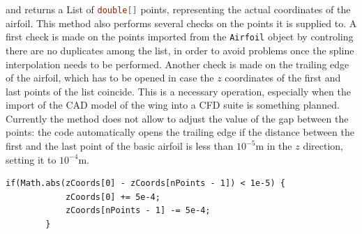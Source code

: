 and returns a \gls{List} of \lstinline[language=Java]!double[]! points, representing the actual coordinates of the airfoil. This method also performs several checks on the points it is supplied to. A first check is made on the points imported from the \lstinline[language=Java]!Airfoil! object by controling there are no duplicates among the list, in order to avoid problems once the spline interpolation needs to be performed. Another check is made on the trailing edge of the airfoil, which has to be opened in case the $z$ coordinates of the first and last points of the list coincide. This is a necessary operation, especially when the import of the \gls{CAD} model of the wing into a \gls{CFD} suite is something planned. Currently the method does not allow to adjust the value of the gap between the points: the code automatically opens the trailing edge if the distance between the first and the last point of the basic airfoil is less than $10^{-5}\si{\meter}$ in the $z$ direction, setting it to $10^{-4}\si{\meter}$.
%
\bigskip
\begin{lstlisting}[caption={Opening creation at the trailing edge}, captionpos=b, tabsize=2, label={lst:OpeningTE}]
if(Math.abs(zCoords[0] - zCoords[nPoints - 1]) < 1e-5) {
			zCoords[0] += 5e-4;
			zCoords[nPoints - 1] -= 5e-4;
		}
\end{lstlisting}

